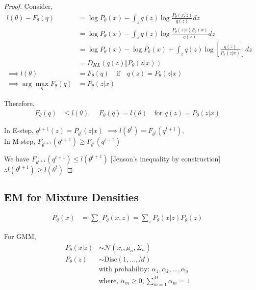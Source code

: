 \documentclass[11pt]{article}
\begin{document}
\begin{proof}
  Consider,
  \begin{align*}
    l(\theta) - F_{\theta}(q) &= \log P_{\theta}(x) - \int_z q(z) \log \frac{P_{\theta}(x, z)}{q(z)}dz \\
                              &= \log P_{\theta}(x) - \int_z q(z) \log \frac{P_{\theta}(z|x)P_{\theta}(x)}{q(z)}dz \\
                              &= \log P_{\theta}(x) - \log P_{\theta}(x) + \int_z q(z) \log \left[ \frac{q(z)}{P_{\theta}(z|x)} \right]dz \\
                              &= D_{KL} \left( q(z) \Vert P_{\theta}(z|x) \right) \\
    \implies l(\theta) &= F_{\theta}(q) \quad\text{if}\quad q(z) = P_{\theta}(z|x) \\
    \implies \arg\max_q F_{\theta}(q) &= P_{\theta}(z|x)
  \end{align*}

  Therefore,
  \begin{align*}
    F_{\theta}(q) &\leq l(\theta), \quad F_{\theta}(q) = l(\theta) \quad\text{for } q(z) = P_{\theta}(z|x)
  \end{align*}

  In E-step, $q^{t+1}(z) = P_{\theta^t}(z|x)$ $\implies l(\theta^t) = F_{\theta^t}(q^{t+1})$,\\
  In M-step, $F_{\theta^{t+1}}(q^{t+1}) \geq F_{\theta^t}(q^{t+1})$

  We have $F_{\theta^{t+1}}(q^{t+1}) \leq l(\theta^{t+1})$ [Jenson's inequality by construction] \\
  $\therefore l(\theta^{t+1}) \geq l(\theta^t)$
\end{proof}

\subsection{EM for Mixture Densities}
\label{sec:em-mixture-densities}

\begin{align*}
  P_{\theta}(x) &= \sum_z P_{\theta}(x, z) = \sum_z P_{\theta}(x|z)P_{\theta}(z)
\end{align*}

For GMM,
\begin{align*}
  P_{\theta}(x | z) &\sim \mathcal{N}\left( x_i, \mu_n, \Sigma_n \right) \\
  P_{\theta}(z) &\sim \text{Disc} \left( 1, ..., M \right) \\
                    &\text{with probability: } \alpha_1, \alpha_2, ..., \alpha_n \\
                    &\text{where, } \alpha_m \geq 0, \sum_{m=1}^M\alpha_m = 1
\end{align*}
\end{document}
